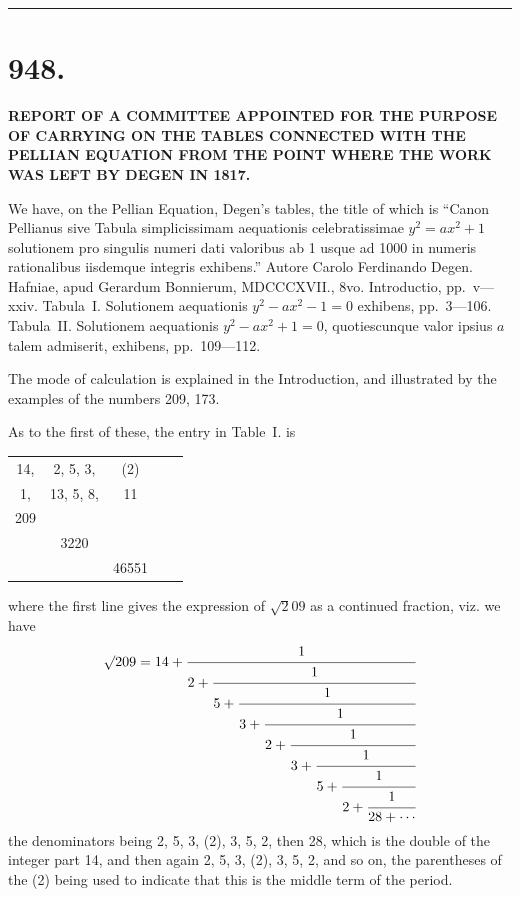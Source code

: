 \documentclass[11pt,a4paper]{book}
\begin{document}
\vspace{1em}
\hrule
\vspace{1em}


\newpage
\section*{948.}

\begin{center}
{\large\bfseries REPORT OF A COMMITTEE APPOINTED FOR THE PURPOSE OF CARRYING ON THE TABLES CONNECTED WITH THE PELLIAN EQUATION FROM THE POINT WHERE THE WORK WAS LEFT BY DEGEN IN 1817.}
\end{center}

\begin{flushright}
\end{flushright}

We have, on the Pellian Equation, Degen's tables, the title of which is ``Canon Pellianus sive Tabula simplicissimam aequationis celebratissimae $y^{2} = ax^{2} + 1$ solutionem pro singulis numeri dati valoribus ab 1 usque ad 1000 in numeris rationalibus iisdemque integris exhibens.'' Autore Carolo Ferdinando Degen. Hafniae, apud Gerardum Bonnierum, MDCCCXVII., 8vo. Introductio, pp.~v---xxiv. Tabula~I. Solutionem aequationis $y^{2} - ax^{2} - 1 = 0$ exhibens, pp.~3---106. Tabula~II. Solutionem aequationis $y^{2} - ax^{2} + 1 = 0$, quotiescunque valor ipsius $a$ talem admiserit, exhibens, pp.~109---112.

The mode of calculation is explained in the Introduction, and illustrated by the examples of the numbers 209, 173.

As to the first of these, the entry in Table~I. is
\begin{center}
\begin{tabular}{ccccc}
14, & 2, 5, 3, & (2) & & \\
1, & 13, 5, 8, & 11 & & \\
209 & & & & \\
& 3220 & & & \\
& & 46551 & &
\end{tabular}
\end{center}
where the first line gives the expression of $\surd 209$ as a continued fraction, viz. we have
\[
\surd 209 = 14 +
\cfrac{1}{2+
 \cfrac{1}{5+
  \cfrac{1}{3+
   \cfrac{1}{2+
    \cfrac{1}{3+
     \cfrac{1}{5+
      \cfrac{1}{2+
       \cfrac{1}{28+\cdots}}}}}}}}
\]
the denominators being 2, 5, 3, (2), 3, 5, 2, then 28, which is the double of the integer part 14, and then again 2, 5, 3, (2), 3, 5, 2, and so on, the parentheses of the (2) being used to indicate that this is the middle term of the period.
\end{document}
